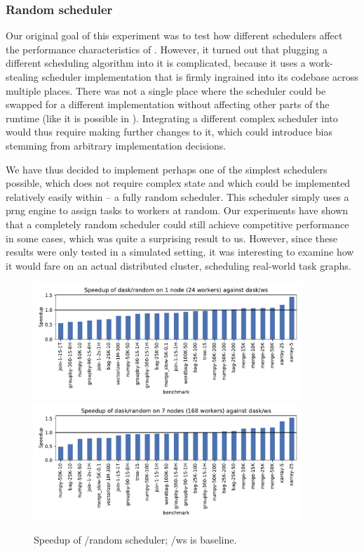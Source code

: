 \subsubsection*{Random scheduler}
Our original goal of this experiment was to test how different schedulers affect the performance
characteristics of \dask{}. However, it turned out that plugging a different
scheduling algorithm into it is complicated, because it uses a work-stealing scheduler
implementation that is firmly ingrained into its codebase across multiple places. There was not a
single place where the scheduler could be swapped for a different implementation without affecting
other parts of the runtime (like it is possible in \estee{}). Integrating a
different complex scheduler into \dask{} would thus require making further
changes to it, which could introduce bias stemming from arbitrary implementation decisions.

We have thus decided to implement perhaps one of the simplest schedulers possible, which does not
require complex state and which could be implemented relatively easily within
\dask{} -- a fully random scheduler. This scheduler simply uses a
\gls{prng} engine to assign tasks to workers at random. Our
\estee{} experiments have shown that a completely random scheduler could still
achieve competitive performance in some cases, which was quite a surprising result to us. However,
since these results were only tested in a simulated setting, it was interesting to examine how it
would fare on an actual distributed cluster, scheduling real-world \dask{} task
graphs.

\begin{figure}
	\centering
	\includegraphics[width=0.9\textwidth]{imgs/rsds/charts/speedup-dask-random-1}
	\includegraphics[width=0.9\textwidth]{imgs/rsds/charts/speedup-dask-random-7}
	\caption{Speedup of \dask{}/random scheduler; \dask{}/ws is baseline.}
	\label{fig:dask-ws-vs-random}
\end{figure}

